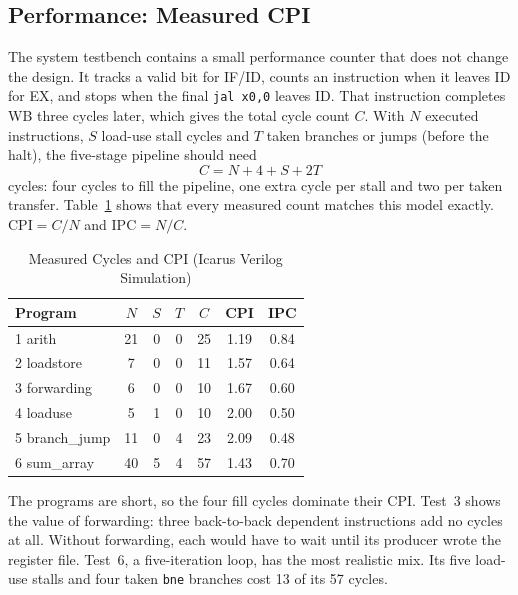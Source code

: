 \subsection{Performance: Measured CPI}
The system testbench contains a small performance counter that does not change the
design. It tracks a valid bit for IF/ID, counts an instruction when it leaves ID for EX,
and stops when the final \texttt{jal x0,0} leaves ID. That instruction completes WB three
cycles later, which gives the total cycle count $C$. With $N$ executed instructions, $S$
load-use stall cycles and $T$ taken branches or jumps (before the halt), the five-stage
pipeline should need
\begin{equation}
C = N + 4 + S + 2T
\end{equation}
cycles: four cycles to fill the pipeline, one extra cycle per stall and two per taken
transfer. Table~\ref{tab:cpi} shows that every measured count matches this model exactly.
$\mathrm{CPI} = C/N$ and $\mathrm{IPC} = N/C$.

\begin{table}[!t]
\centering
\caption{Measured Cycles and CPI (Icarus Verilog Simulation)}
\label{tab:cpi}
\setlength{\tabcolsep}{4pt}
\renewcommand{\arraystretch}{1.08}
\begin{tabular}{@{}lcccccc@{}}
\toprule
\textbf{Program} & $N$ & $S$ & $T$ & $C$ & \textbf{CPI} & \textbf{IPC} \\ \midrule
1 arith       & 21 & 0 & 0 & 25 & 1.19 & 0.84 \\
2 loadstore   & 7  & 0 & 0 & 11 & 1.57 & 0.64 \\
3 forwarding  & 6  & 0 & 0 & 10 & 1.67 & 0.60 \\
4 loaduse     & 5  & 1 & 0 & 10 & 2.00 & 0.50 \\
5 branch\_jump & 11 & 0 & 4 & 23 & 2.09 & 0.48 \\
6 sum\_array  & 40 & 5 & 4 & 57 & 1.43 & 0.70 \\ \bottomrule
\end{tabular}
\end{table}

The programs are short, so the four fill cycles dominate their CPI. Test~3 shows the
value of forwarding: three back-to-back dependent instructions add no cycles at all.
Without forwarding, each would have to wait until its producer wrote the register file.
Test~6, a five-iteration loop, has the most realistic mix. Its five load-use stalls and
four taken \texttt{bne} branches cost 13 of its 57 cycles.

